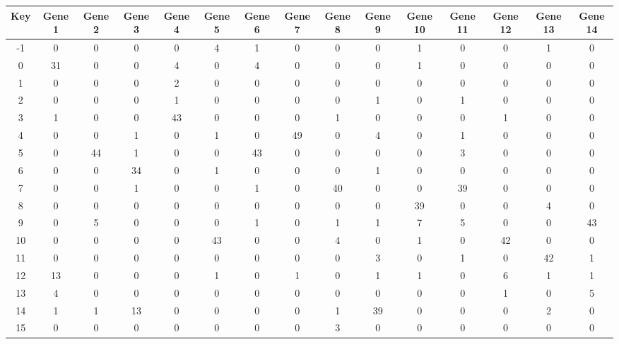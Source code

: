 \begin{tabular}{|c|c|c|c|c|c|c|c|c|c|c|c|c|c|c|}
\hline
Key & Gene 1 & Gene 2 & Gene 3 & Gene 4 & Gene 5 & Gene 6 & Gene 7 & Gene 8 & Gene 9 & Gene 10 & Gene 11 & Gene 12 & Gene 13 & Gene 14 \\
\hline
-1 & 0 & 0 & 0 & 0 & 4 & 1 & 0 & 0 & 0 & 1 & 0 & 0 & 1 & 0 \\
0 & 31 & 0 & 0 & 4 & 0 & 4 & 0 & 0 & 0 & 1 & 0 & 0 & 0 & 0 \\
1 & 0 & 0 & 0 & 2 & 0 & 0 & 0 & 0 & 0 & 0 & 0 & 0 & 0 & 0 \\
2 & 0 & 0 & 0 & 1 & 0 & 0 & 0 & 0 & 1 & 0 & 1 & 0 & 0 & 0 \\
3 & 1 & 0 & 0 & 43 & 0 & 0 & 0 & 1 & 0 & 0 & 0 & 1 & 0 & 0 \\
4 & 0 & 0 & 1 & 0 & 1 & 0 & 49 & 0 & 4 & 0 & 1 & 0 & 0 & 0 \\
5 & 0 & 44 & 1 & 0 & 0 & 43 & 0 & 0 & 0 & 0 & 3 & 0 & 0 & 0 \\
6 & 0 & 0 & 34 & 0 & 1 & 0 & 0 & 0 & 1 & 0 & 0 & 0 & 0 & 0 \\
7 & 0 & 0 & 1 & 0 & 0 & 1 & 0 & 40 & 0 & 0 & 39 & 0 & 0 & 0 \\
8 & 0 & 0 & 0 & 0 & 0 & 0 & 0 & 0 & 0 & 39 & 0 & 0 & 4 & 0 \\
9 & 0 & 5 & 0 & 0 & 0 & 1 & 0 & 1 & 1 & 7 & 5 & 0 & 0 & 43 \\
10 & 0 & 0 & 0 & 0 & 43 & 0 & 0 & 4 & 0 & 1 & 0 & 42 & 0 & 0 \\
11 & 0 & 0 & 0 & 0 & 0 & 0 & 0 & 0 & 3 & 0 & 1 & 0 & 42 & 1 \\
12 & 13 & 0 & 0 & 0 & 1 & 0 & 1 & 0 & 1 & 1 & 0 & 6 & 1 & 1 \\
13 & 4 & 0 & 0 & 0 & 0 & 0 & 0 & 0 & 0 & 0 & 0 & 1 & 0 & 5 \\
14 & 1 & 1 & 13 & 0 & 0 & 0 & 0 & 1 & 39 & 0 & 0 & 0 & 2 & 0 \\
15 & 0 & 0 & 0 & 0 & 0 & 0 & 0 & 3 & 0 & 0 & 0 & 0 & 0 & 0 \\
\hline
\end{tabular}